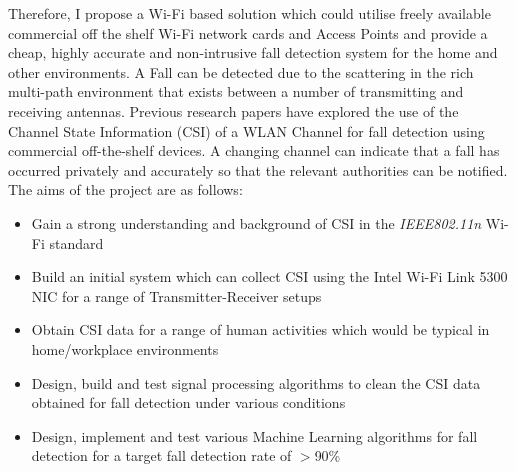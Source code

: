 Therefore, I propose a Wi-Fi based solution which could utilise freely available commercial off the shelf Wi-Fi network cards and Access Points and provide a cheap, highly accurate and non-intrusive fall detection system for the home and other environments. A Fall can be detected due to the scattering in the rich multi-path environment that exists between a number of transmitting and receiving antennas. Previous research papers have explored the use of the Channel State Information (CSI) of a WLAN Channel for fall detection using commercial off-the-shelf devices. A changing channel can indicate that a fall has occurred privately and accurately so that the relevant authorities can be notified. \\
The aims of the project are as follows: 
\begin{itemize}[noitemsep, topsep=0pt]
\item Gain a strong understanding and background of CSI in the \textit{IEEE802.11n} Wi-Fi standard 
\item Build an initial system which can collect CSI using the Intel Wi-Fi Link 5300 NIC for a range of Transmitter-Receiver setups
\item Obtain CSI data for a range of human activities which would be typical in home/workplace environments
\item Design, build and test signal processing algorithms to clean the CSI data obtained for fall detection under various conditions
\item Design, implement and test various Machine Learning algorithms for fall detection for a target fall detection rate of $>$90\%
\end{itemize}
